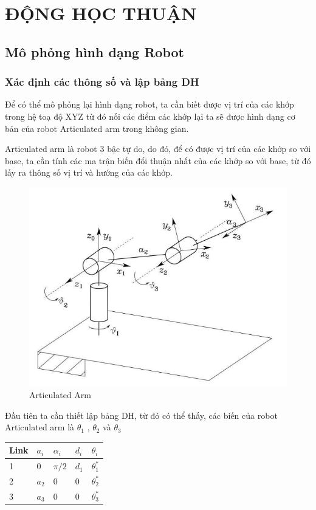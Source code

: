 \section{ĐỘNG HỌC THUẬN}
\subsection{Mô phỏng hình dạng Robot}
\subsubsection{Xác định các thông số và lập bảng DH}

Để có thể mô phỏng lại hình dạng robot, ta cần biết được vị trí của các khớp
trong hệ toạ độ XYZ từ đó nối các điểm các khớp lại ta sẽ được hình dạng cơ bản của robot Articulated arm trong không gian.

Articulated arm là robot 3 bậc tự do, do đó, để có được vị trí của các khớp so
với base, ta cần tính các ma trận biến đổi thuận nhất của các khớp so với base, từ
đó lấy ra thông số vị trí và hướng của các khớp.

\begin{figure}[H]
	\centering
	\includegraphics[width=0.8\linewidth]{Images/arti_arm.png}
	\caption{Articulated Arm}
	\label{fig:enter-label3}
\end{figure}

Đầu tiên ta cần thiết lập bảng DH, từ đó có thể thấy, các biến của robot
Articulated arm là $\theta_{1}$ , $\theta_{2}$ và $\theta_{3}$

\begin{center}
	\begin{tabular}{|m{2cm}|m{2cm}|m{2cm}|m{2cm}|m{2cm}|} 
		\hline
		Link & $a_{i}$ & $\alpha_{i}$ & $d_{i}$ & $\theta_{i}$\\ [0.5ex] 
		\hline
		1 & 0 & $\pi/2$ & $d_{1}$ & $\theta_{1}^{*}$\\ 
		\hline
		2 & $a_{2}$ & 0 & 0 & $\theta_{2}^{*}$\\
		\hline
		3 & $a_{3}$ & 0 & 0 & $\theta_{3}^{*}$\\ [0.5ex] 
		\hline
	\end{tabular}
\end{center}

